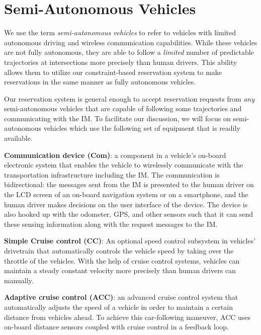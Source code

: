 \section{Semi-Autonomous Vehicles}
\label{sec:vehicles}

We use the term \emph{semi-autonomous vehicles} to
refer to vehicles with limited autonomous driving and wireless
communication capabilities.  While these vehicles are not fully
autonomous, they are able to follow a \emph{limited}
number of predictable trajectories at intersections more precisely
than human drivers.  This ability allows them to utilize our
constraint-based reservation system to make reservations in the same
manner as fully autonomous vehicles.

Our reservation system is general enough to accept
reservation requests from \emph{any} semi-autonomous vehicles that are
capable of following some trajectories and communicating with the IM\@.
To facilitate our discussion, we will focus on semi-autonomous
vehicles which use the following set of equipment that is readily
available.

\begin{small_ind_s_itemize}

\item \textbf{Communication device (Com)}:
a component in a vehicle's on-board electronic system that enables the
vehicle to wirelessly communicate with the transportation
infrastructure including the IM\@.  The communication is bidirectional:
the messages sent from the IM is presented to the human driver on
the LCD screen of an on-board navigation system or on a smartphone, and
the human driver makes decisions on the user interface of the device.
The device is also hooked up with the odometer, GPS, and other sensors
such that it can send these sensing information along with the request
messages to the IM.

\item \textbf{Simple Cruise control (CC)}:
An optional speed control subsystem in vehicles' drivetrain that
automatically controls the vehicle speed by taking over the throttle
of the vehicles.  With the help of cruise control systems, vehicles
can maintain a steady constant velocity more precisely than human
drivers can manually.

\item \textbf{Adaptive cruise control (ACC)}:
an advanced cruise control system that automatically adjusts the speed
of a vehicle in order to maintain a certain distance from vehicles
ahead. To achieve this car-following maneuver,
ACC uses on-board distance sensors coupled with cruise control
in a feedback loop.

\end{small_ind_s_itemize}

